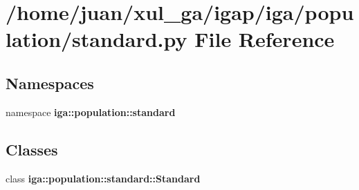 \section{/home/juan/xul\_\-ga/igap/iga/population/standard.py File Reference}
\label{standard_8py}
\subsection*{Namespaces}
\begin{CompactItemize}
\item 
namespace {\bf iga::population::standard}
\end{CompactItemize}
\subsection*{Classes}
\begin{CompactItemize}
\item 
class {\bf iga::population::standard::Standard}
\end{CompactItemize}
